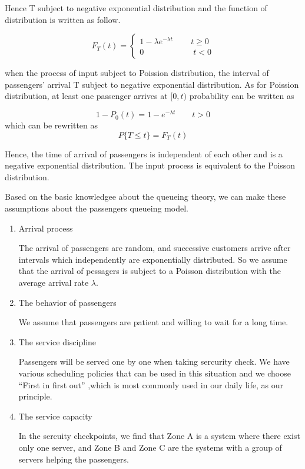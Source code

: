 \documentclass{mcmthesis}
\begin{document}
Hence T subject to negative exponential distribution and the function of distribution is written as follow.

\begin{equation}    
F_T(t)=\left  \{
       \begin{array}{lr}
          1- \lambda e^{-\lambda t}\qquad\,  t\geqslant 0\\
            0\qquad\qquad\qquad t<0
        \end{array}
\right.
\end{equation}

when the  process of input subject to Poission distribution, the interval of passengers' arrival T subject to  negative exponential distribution. As for Poission  distribution, at least one passenger arrives at $[0,t)$  probability can  be written as


\begin{equation}
1-P_0(t)=1-e^{-\lambda t}\qquad t>0
\end{equation}
which can be rewritten as
\begin{equation}
 P\{T\leqslant t \}=F_T(t)
\end{equation}


Hence, the time of arrival of passengers is independent of each other and is a negative exponential distribution. The input process is equivalent to the Poisson distribution.

	Based on the basic knowledgee about the queueing theory, we can make these assumptions about the passengers queueing model.
		\begin{enumerate}
			\item Arrival process
			
			 The arrival of passengers are random, and successive customers arrive after intervals which independently are exponentially distributed. So we assume that the arrival of pessagers is subject to a Poisson distribution with the average arrival rate ${\lambda}$.
			\item The behavior of passengers 
			
			 We assume that passengers are patient and willing to wait for a long time.
			\item The service discipline 
			
			 Passengers will be served one by one when taking sercurity check. We have various scheduling policies that can be used in this situation and we choose ``First in first out'' ,which is most commonly used in our daily life, as our principle.
			\item The service capacity 
			
			 In the sercuity checkpoints, we find that Zone A is a system where there exist only one server, and Zone B and Zone C are the systems with a group of servers helping the passengers.
		\end{enumerate}	
\end{document}
